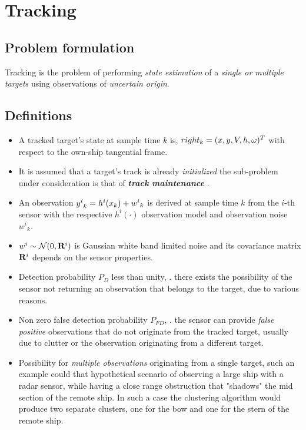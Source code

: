 \chapter{Tracking}\label{ch:Tracking}

\section{Problem formulation}

Tracking is the problem of performing \emph{state estimation} of a \emph{single or multiple targets} using observations of \emph{uncertain origin}.

\section{Definitions}

\begin{itemize}
	\item A tracked target's state at sample time $k$ is, $\\right _k=(x,y,V,h,\omega)^T$ with respect to the own-ship tangential frame.
	\item It is assumed that a target's track is already \emph{initialized} \ie the sub-problem under consideration is that of \emph{\textbf{track maintenance}} .
	\item An observation ${{y}^i}_k = h^i(x_k) + {w^i}_k$ is derived at sample time $k$ from the $i$-th sensor with the respective $h^i(\cdot)$ observation model and observation noise ${w^i}_k$.
	\item $w^i \sim \mathcal{N}(0, \mathbf{R}^i)$ is Gaussian white band limited noise and its covariance matrix $\mathbf{R}^i$ depends on the sensor properties.
	\item Detection probability $P_D$ less than unity, \ie. there exists the possibility of the sensor not returning an observation that belongs to the target, due to various reasons.
	\item Non zero false detection probability $P_{FD}$, \ie. the sensor can provide  \emph{false positive} observations that do not originate from the tracked target, usually due to clutter or the observation originating from a different target.
	\item Possibility for \emph{multiple observations} originating from a single target, such an example could that hypothetical scenario of observing a large ship with a radar sensor, while having a close range obstruction that "shadows" the mid section of the remote ship. In such a case the clustering algorithm would produce two separate clusters, one for the bow and one for the stern of the remote ship.
\end{itemize}

